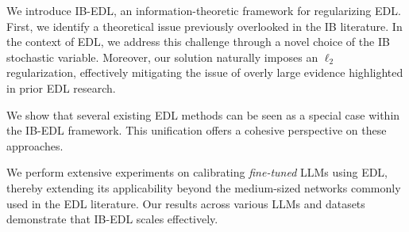 {
\setlength{\leftmargini}{0pt} %
\begin{compactitem}[$\bullet$]
   \item We introduce IB-EDL, an information-theoretic framework for regularizing EDL. First, we identify a theoretical issue previously overlooked in the IB literature. In the context of EDL, we address this challenge through a novel choice of the IB stochastic variable. Moreover, our solution naturally imposes an $\ell_2$ regularization, effectively mitigating the issue of overly large evidence highlighted in prior EDL research.
   \item We show that several existing EDL methods can be seen as a special case within the IB-EDL framework. This unification offers a cohesive perspective on these approaches.
   \item We perform extensive experiments on calibrating \emph{fine-tuned} LLMs using EDL, thereby extending its applicability beyond the medium-sized networks commonly used in the EDL literature. Our results across various LLMs and datasets demonstrate that IB-EDL scales effectively.
    \end{compactitem}
}



